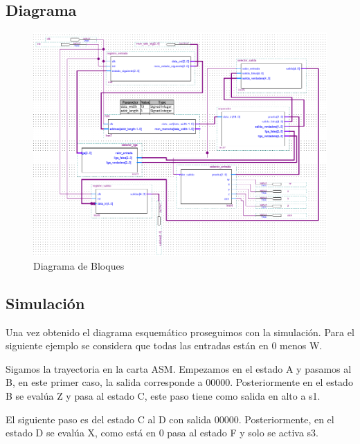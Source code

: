 \documentclass[table]{scrartcl}
\begin{document}
\subsection{Diagrama}\label{sec:diagrama}
\begin{figure}[htbp]
  \centering
  \includegraphics[width=\textwidth]{./img/dia.png}
  \caption{Diagrama de Bloques}
\end{figure}

\subsection{Simulación}\label{sec:simulacion}
Una vez obtenido el diagrama esquemático proseguimos con la simulación.
Para el siguiente ejemplo se considera que todas las entradas están en 0
menos W.

Sigamos la trayectoria en la carta ASM. Empezamos en el estado A y
pasamos al B, en este primer caso, la salida corresponde a 00000.
Posteriormente en el estado B se evalúa Z y pasa al estado C, este paso tiene
como salida en alto a s1.

El siguiente paso es del estado C al D con salida $00000$. Posteriormente, en
el estado D se evalúa X, como está en 0 pasa al estado F y solo se activa s3.
\end{document}
